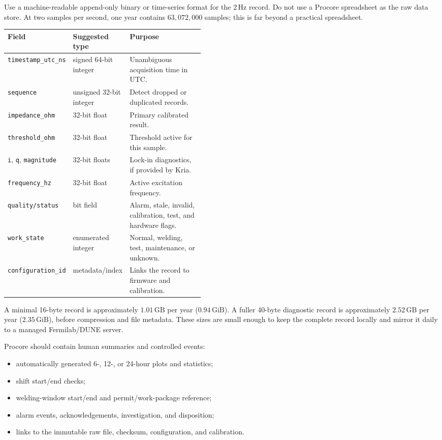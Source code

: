 \documentclass[11pt]{article}
\begin{document}
Use a machine-readable append-only binary or time-series format for the $2\,\mathrm{Hz}$ record. Do not use a Procore spreadsheet as the raw data store. At two samples per second, one year contains $63{,}072{,}000$ samples; this is far beyond a practical spreadsheet.

\begin{tabularx}{\linewidth}{@{}L{0.25\linewidth}L{0.2\linewidth}Y@{}}
\toprule
Field & Suggested type & Purpose \\
\midrule
\texttt{timestamp\_utc\_ns} & signed 64-bit integer & Unambiguous acquisition time in UTC. \\
\texttt{sequence} & unsigned 32-bit integer & Detect dropped or duplicated records. \\
\texttt{impedance\_ohm} & 32-bit float & Primary calibrated result. \\
\texttt{threshold\_ohm} & 32-bit float & Threshold active for this sample. \\
\texttt{i}, \texttt{q}, \texttt{magnitude} & 32-bit floats & Lock-in diagnostics, if provided by Kria. \\
\texttt{frequency\_hz} & 32-bit float & Active excitation frequency. \\
\texttt{quality/status} & bit field & Alarm, stale, invalid, calibration, test, and hardware flags. \\
\texttt{work\_state} & enumerated integer & Normal, welding, test, maintenance, or unknown. \\
\texttt{configuration\_id} & metadata/index & Links the record to firmware and calibration. \\
\bottomrule
\end{tabularx}

A minimal 16-byte record is approximately $1.01\,\mathrm{GB}$ per year ($0.94\,\mathrm{GiB}$). A fuller 40-byte diagnostic record is approximately $2.52\,\mathrm{GB}$ per year ($2.35\,\mathrm{GiB}$), before compression and file metadata. These sizes are small enough to keep the complete record locally and mirror it daily to a managed Fermilab/DUNE server.

Procore should contain human summaries and controlled events:

\begin{itemize}
  \item automatically generated 6-, 12-, or 24-hour plots and statistics;
  \item shift start/end checks;
  \item welding-window start/end and permit/work-package reference;
  \item alarm events, acknowledgements, investigation, and disposition;
  \item links to the immutable raw file, checksum, configuration, and calibration.
\end{itemize}
\end{document}
